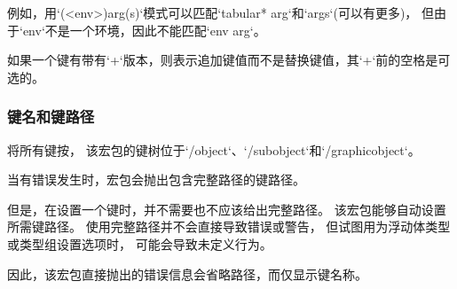 例如，用`(<env>)arg(s)`模式可以匹配`tabular* arg`和`args`(可以有更多)，
但由于`env`不是一个环境，因此不能匹配`env arg`。

如果一个键有带有`+`版本，则表示追加键值而不是替换键值，其`+`前的空格是可选的。

\subsubsection{键名和键路径}
\label{key-name-vs-key-path}

将所有键按，
该宏包的键树位于`/object`、`/subobject`和`/graphicobject`。


当有错误发生时，宏包会抛出包含完整路径的键路径。

但是，在设置一个键时，并不需要也不应该给出完整路径。
该宏包能够自动设置所需键路径。
使用完整路径并不会直接导致错误或警告，
但试图用\cmd{\objectset}为浮动体类型或类型组设置选项时，
可能会导致未定义行为。

因此，该宏包直接抛出的错误信息会省略路径，而仅显示键名称。

